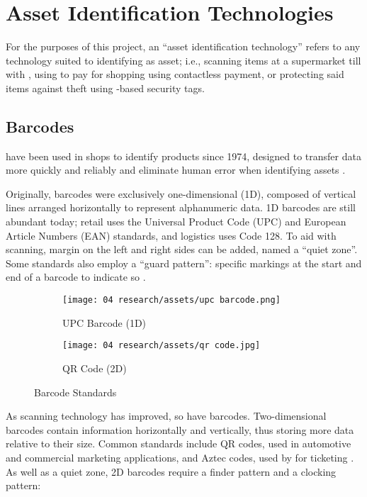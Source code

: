 \section{Asset Identification Technologies}

For the purposes of this project, an \enquote{asset
  identification technology} refers to any technology suited
to identifying as asset; i.e., scanning items at a
supermarket till with ,
using  to pay for shopping using
contactless payment, or protecting said items against theft
using -based security tags.

\subsection{Barcodes} \label{ss:barcodes}

 have been used in shops to identify products
since 1974, designed to transfer data more quickly and
reliably and eliminate human error when identifying assets
\parencite{whatIsABarcode}.

Originally, barcodes were exclusively one-dimensional (1D),
composed of vertical lines arranged horizontally to
represent alphanumeric data.
1D barcodes are still abundant today; retail uses
the Universal Product Code (UPC) and European Article
Numbers (EAN) standards, and logistics uses Code 128.
To aid with scanning, margin on the left and right sides
can be added, named a \enquote{quiet zone}.
Some standards also employ a \enquote{guard pattern}:
specific markings at the start and end of a barcode to
indicate so \parencite{whatIsABarcode}.

\begin{figure}[H]
  \centering
  \begin{subfigure}{\subfigwidth}
    \centering
    \texttt{[image: 04
      research/assets/upc barcode.png]}
    \caption{UPC Barcode (1D)}
    \parencite{img:upcBarcode}
  \end{subfigure}
  \begin{subfigure}{\subfigwidth}
    \centering
    \texttt{[image: 04
      research/assets/qr code.jpg]}
    \caption{QR Code (2D)}
    \parencite{img:qrCode}
  \end{subfigure}
  \caption{Barcode Standards}
\end{figure}

As scanning technology has improved, so have barcodes.
Two-dimensional barcodes contain information horizontally
and vertically, thus storing more data relative to their
size.
Common standards include QR codes, used in automotive and
commercial marketing applications, and Aztec codes, used by
for ticketing \parencite{whatIsABarcode}.
As well as a quiet zone, 2D barcodes require a finder
pattern and a clocking pattern: 

